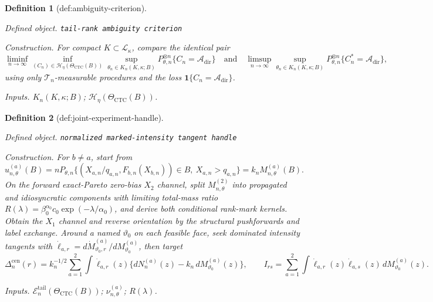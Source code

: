 \documentclass{article}
\newtheorem{definition}{Definition}
\begin{document}
\begin{definition}[def:ambiguity-criterion]\label{def:ambiguity-criterion}
\par\smallskip\noindent\emph{Defined object.} \texttt{tail-\allowbreak{}rank ambiguity criterion}
\par\smallskip\noindent\emph{Construction.} For compact \(K\subset\mathcal L_\kappa\), compare the identical pair \[\liminf_{n\to\infty}\inf_{(C_n)\in\mathcal H_\eta(\Theta_{\mathrm{CTC}}(B))}\sup_{\theta_n\in K_n(K,\kappa;B)}P_{\theta,n}^{\otimes n}\{C_n=\mathcal A_{\mathrm{dir}}\}\quad\text{and}\quad\limsup_{n\to\infty}\sup_{\theta_n\in K_n(K,\kappa;B)}P_{\theta,n}^{\otimes n}\{C_n^*=\mathcal A_{\mathrm{dir}}\},\] using only \(\mathcal T_n\)-measurable procedures and the loss \(\mathbf 1\{C_n=\mathcal A_{\mathrm{dir}}\}\).
\par\smallskip\noindent\emph{Inputs.} \(K_n(K,\kappa;B)\); \(\mathcal H_\eta(\Theta_{\mathrm{CTC}}(B))\).
\end{definition}

\begin{definition}[def:joint-experiment-handle]\label{def:joint-experiment-handle}
\par\smallskip\noindent\emph{Defined object.} \texttt{normalized marked-\allowbreak{}intensity tangent handle}
\par\smallskip\noindent\emph{Construction.} For \(b\neq a\), start from \[
u_{n,\theta}^{(a)}(B)=nP_{\theta,n}\{(X_{a,n}/q_{a,n},F_{b,n}(X_{b,n}))\in B,\ X_{a,n}>q_{a,n}\}=k_nM_{n,\theta}^{(a)}(B).\] On the forward exact-Pareto zero-bias \(X_2\) channel, split \(M_{n,\theta}^{(2)}\) into propagated and idiosyncratic components with limiting total-mass ratio \(R(\lambda)=\beta_0^{\alpha_0}c_0\exp(-\lambda/\alpha_0)\), and derive both conditional rank-mark kernels. Obtain the \(X_1\) channel and reverse orientation by the structural pushforwards and label exchange. Around a named \(\vartheta_0\) on each feasible face, seek dominated intensity tangents with \(\dot\ell_{a,r}=d\dot M_{\vartheta_0,r}^{(a)}/dM_{\vartheta_0}^{(a)}\), then target \[\mathbb{\Delta}^{\mathrm{cen}}_n(r)=k_n^{-1/2}\sum_{a=1}^2\int\dot\ell_{a,r}(z)\{dN_n^{(a)}(z)-k_n\,dM_{\vartheta_0}^{(a)}(z)\},\qquad I_{rs}=\sum_{a=1}^2\int\dot\ell_{a,r}(z)\dot\ell_{a,s}(z)\,dM_{\vartheta_0}^{(a)}(z).\]
\par\smallskip\noindent\emph{Inputs.} \(\mathcal E_n^{\mathrm{tail}}(\Theta_{\mathrm{CTC}}(B))\); \(\nu_{n,\theta}^{(a)}\); \(R(\lambda)\).
\end{definition}
\end{document}
